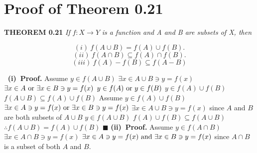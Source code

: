 \documentclass[12pt]{article}
\begin{document}
	\maketitle
  \section[20pt]{Proof of Theorem 0.21}
	\textbf{THEOREM 0.21} \textit{If} \(f:X \rightarrow Y\) \textit{is a function and A and B are subsets of X, then}
	\begin{adjustwidth}{-2cm}{0cm}
		\begin{flushleft}
		\[(i)\ f(A\cup B) = f(A) \cup f(B). \]
		\[(ii)\ f(A \cap B) \subseteq f(A) \cap f(B). \]
		\[(iii)\ f(A) - f(B) \subseteq f(A - B) \]
	\end{flushleft}
	\end{adjustwidth}
	\(\ \) \newline
	\textbf{(i)\ Proof.}
	\newline
	Assume \(y \in f(A\cup B)\)
	\newline
	\(\exists x \in A \cup B \ni y = f(x)\)
	\newline
	\(\exists x \in A \textup{ or }\exists x \in B \ni y = f(x)\)
	\newline
	\(y \in f(A) \textup{ or }y \in f(B)\)
	\newline
	\(y \in f(A) \cup f(B)\)
	\newline
	\(f(A \cup B) \subseteq f(A) \cup f(B)\)
	\newline
	Assume \(y \in f(A) \cup f(B)\)
	\newline
	\(\exists x \in A \ni y = f(x)\textup{ or } \exists x \in B\ni y = f(x)\)
	\newline
	\(\exists x \in A \cup B\ni y = f(x)\) since \(A\) and \(B\) are both subsets of \(A \cup B\)
	\newline
	\(y \in f(A \cup B)\)
	\newline
	\(f(A) \cup f(B) \subseteq f(A \cup B)\)
	\newline
	\(\therefore f(A \cup B) = f(A) \cup f(B)\)
	\newline \(\blacksquare\) \newline \newline
	\textbf{(ii)\ Proof.}
	\newline
	Assume \(y \in f(A\cap B)\)
	\newline
	\(\exists x \in A\cap B\ni y = f(x)\)
	\newline
	\(\exists x \in A \ni y = f(x)\textup{ and } \exists x \in B\ni y = f(x)\) since \(A\cap B\) is a subset of both \(A\) and \(B\).
\end{document}
